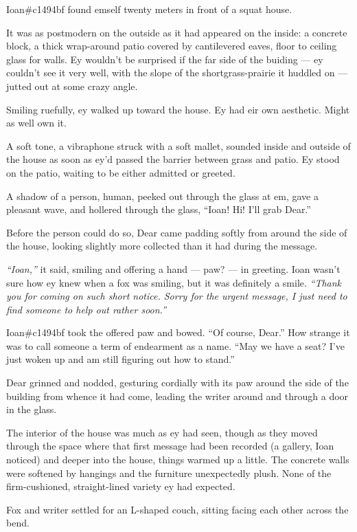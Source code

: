 Ioan\#c1494bf found emself twenty meters in front of a squat house.

It was as postmodern on the outside as it had appeared on the inside: a concrete block, a thick wrap-around patio covered by cantilevered eaves, floor to ceiling glass for walls. Ey wouldn't be surprised if the far side of the buiding --- ey couldn't see it very well, with the slope of the shortgrass-prairie it huddled on --- jutted out at some crazy angle.

Smiling ruefully, ey walked up toward the house. Ey had eir own aesthetic. Might as well own it.

A soft tone, a vibraphone struck with a soft mallet, sounded inside and outside of the house as soon as ey'd passed the barrier between grass and patio. Ey stood on the patio, waiting to be either admitted or greeted.

A shadow of a person, human, peeked out through the glass at em, gave a pleasant wave, and hollered through the glass, ``Ioan! Hi! I'll grab Dear.''

Before the person could do so, Dear came padding softly from around the side of the house, looking slightly more collected than it had during the message.

\emph{``Ioan,''} it said, smiling and offering a hand --- paw? --- in greeting. Ioan wasn't sure how ey knew when a fox was smiling, but it was definitely a smile. \emph{``Thank you for coming on such short notice. Sorry for the urgent message, I just need to find someone to help out rather soon.''}

Ioan\#c1494bf took the offered paw and bowed. ``Of course, Dear.'' How strange it was to call someone a term of endearment as a name. ``May we have a seat? I've just woken up and am still figuring out how to stand.''

Dear grinned and nodded, gesturing cordially with its paw around the side of the building from whence it had come, leading the writer around and through a door in the glass.

The interior of the house was much as ey had seen, though as they moved through the space where that first message had been recorded (a gallery, Ioan noticed) and deeper into the house, things warmed up a little. The concrete walls were softened by hangings and the furniture unexpectedly plush. None of the firm-cushioned, straight-lined variety ey had expected.

Fox and writer settled for an L-shaped couch, sitting facing each other across the bend.

